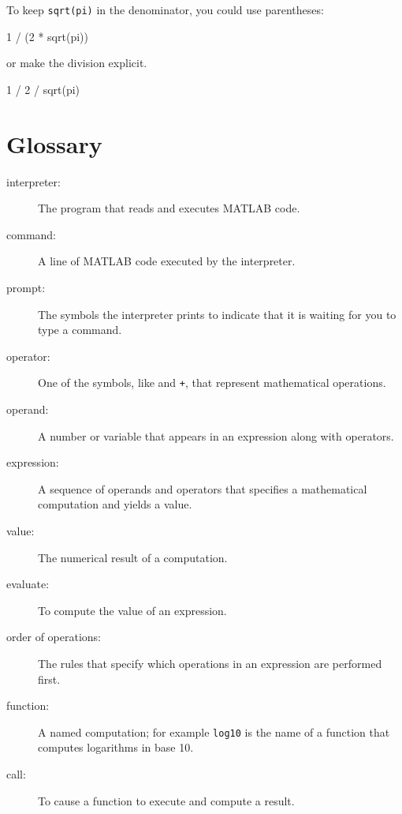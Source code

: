 \documentclass[main.tex]{subfiles}
\begin{document}
To keep {\tt sqrt(pi)} in the denominator, you could use parentheses:

\begin{code}
1 / (2 * sqrt(pi))
\end{code}

or make the division explicit.

\begin{code}
1 / 2 / sqrt(pi)
\end{code}



\section{Glossary}

\begin{description}

\item[interpreter:] The program that reads and executes MATLAB code.

\item[command:] A line of MATLAB code executed by the interpreter.

\item[prompt:] The symbols the interpreter prints to indicate that it is
waiting for you to type a command.

\item[operator:] One of the symbols, like {\tt *} and {\tt +}, that
represent mathematical operations.

\item[operand:] A number or variable that appears in an expression along
with operators.

\item[expression:] A sequence of operands and operators that specifies
a mathematical computation and yields a value.

\item[value:] The numerical result of a computation.

\item[evaluate:] To compute the value of an expression.

\item[order of operations:] The rules that specify which operations
in an expression are performed first.

\item[function:] A named computation; for example {\tt log10} is the
name of a function that computes logarithms in base 10.

\item[call:] To cause a function to execute and compute a result.


\end{description}
\end{document}

